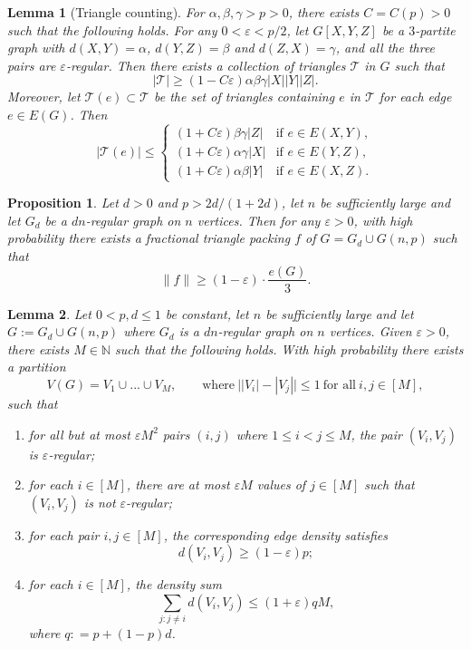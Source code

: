 \documentclass[10pt,a4paper]{amsart}
\newtheorem{lemma}{Lemma}
\newtheorem{proposition}{Proposition}
\newcommand\dT{\mathcal{T}}
\renewcommand\ge{\geqslant}
\renewcommand\geq{\geqslant}
\renewcommand\le{\leqslant}
\renewcommand\leq{\leqslant}
\begin{document}
\begin{lemma}[Triangle counting]\label{lem:trianglecounting}
For $\alpha,\beta,\gamma>p>0$, there exists $C=C(p)>0$ such that the following holds. For any $0<\varepsilon<p/2$, let $G[X,Y,Z]$ be a $3$-partite graph with $d(X,Y)=\alpha$, $d(Y,Z)=\beta$ and $d(Z,X)=\gamma$, and all the three pairs are $\varepsilon$-regular. Then there exists a collection of triangles $\mathcal T$ in $G$ such that
\[
|\mathcal T|
\ge
(1-C\varepsilon)\alpha\beta\gamma |X||Y||Z|.
\]
Moreover, let $\dT(e)\subset\dT$ be the set of triangles containing $e$ in $\dT$ for each edge $e\in E(G)$. Then
\begin{equation}\label{eq:Taue}
|\dT(e)| \le
\begin{cases}
(1+C\varepsilon)\beta\gamma |Z| & \text{if } e \in E(X,Y), \\[4pt]
(1+C\varepsilon)\alpha\gamma |X| & \text{if } e \in E(Y,Z), \\[4pt]
(1+C\varepsilon)\alpha\beta |Y| & \text{if } e \in E(X,Z).
\end{cases}
\end{equation}
\end{lemma}

\begin{proposition}\label{prop:fractionalpacking}
Let $d>0$ and $p> 2d/(1+2d)$, let $n$ be sufficiently large and let $G_d$ be a $dn$-regular graph on $n$ vertices. Then for any $\varepsilon>0$, with high probability there exists a fractional triangle packing $f$ of $G=G_d\cup G(n,p)$ such that
$$\|f\|\ge (1-\varepsilon)\cdot \frac{e(G)}{3}.$$
\end{proposition}

\begin{lemma}\label{lem:Gpartition}
Let $0<p,d\leq 1$ be constant, let $n$ be sufficiently large and let $G:=G_d\cup G(n,p)$ where $G_d$ is a $dn$-regular graph on $n$ vertices. Given $\varepsilon>0$, there exists $M\in\mathbb{N}$ such that the following holds. With high probability there exists a partition 
$$V(G)=V_1\cup...\cup V_M,\qquad\text{where}\ \big||V_i|-|V_j|\big|\leq 1\ \text{for all}\ i,j\in[M],$$ 
such that 
\begin{enumerate}
    \item[(i)] for all but at most $\varepsilon M^2$ pairs $(i,j)$ where $1\le i<j\le M$, the pair $(V_i,V_j)$ is $\varepsilon$-regular;

    \item[(ii)] for each $i\in [M]$, there are at most $\varepsilon M$ values of $j\in [M]$ such that $(V_i,V_j)$ is not $\varepsilon$-regular;

    \item[(iii)] for each pair $i,j\in [M]$, the corresponding edge density satisfies
    $$d(V_i,V_j)\geq (1-\varepsilon)p;$$

    \item[(iv)]  for each $i\in [M]$, the density sum 
    $$\sum_{j: j\neq i}d(V_i,V_j)\leq (1+\varepsilon)qM,$$ where $q: = p+(1-p)d$.
\end{enumerate}
\end{lemma}
\end{document}
